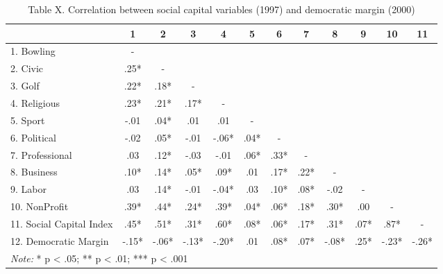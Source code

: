 \documentclass[
  english,
  man]{apa6}
\begin{document}
\begin{table}

\caption{\label{tab:regression}Table X. Correlation between social capital variables (1997) and democratic margin (2000)}
\centering
\begin{tabular}[t]{l|c|c|c|c|c|c|c|c|c|c|c}
\hline
  & 1 & 2 & 3 & 4 & 5 & 6 & 7 & 8 & 9 & 10 & 11\\
\hline
1. Bowling & - &  &  &  &  &  &  &  &  &  & \\
\hline
2. Civic & .25* & - &  &  &  &  &  &  &  &  & \\
\hline
3. Golf & .22* & .18* & - &  &  &  &  &  &  &  & \\
\hline
4. Religious & .23* & .21* & .17* & - &  &  &  &  &  &  & \\
\hline
5. Sport & -.01 & .04* & .01 & .01 & - &  &  &  &  &  & \\
\hline
6. Political & -.02 & .05* & -.01 & -.06* & .04* & - &  &  &  &  & \\
\hline
7. Professional & .03 & .12* & -.03 & -.01 & .06* & .33* & - &  &  &  & \\
\hline
8. Business & .10* & .14* & .05* & .09* & .01 & .17* & .22* & - &  &  & \\
\hline
9. Labor & .03 & .14* & -.01 & -.04* & .03 & .10* & .08* & -.02 & - &  & \\
\hline
10. NonProfit & .39* & .44* & .24* & .39* & .04* & .06* & .18* & .30* & .00 & - & \\
\hline
11. Social Capital Index & .45* & .51* & .31* & .60* & .08* & .06* & .17* & .31* & .07* & .87* & -\\
\hline
12. Democratic Margin & -.15* & -.06* & -.13* & -.20* & .01 & .08* & .07* & -.08* & .25* & -.23* & -.26*\\
\hline
\multicolumn{12}{l}{\rule{0pt}{1em}\textit{Note: } * p < .05; ** p < .01; *** p < .001}\\
\end{tabular}
\end{table}
\end{document}
